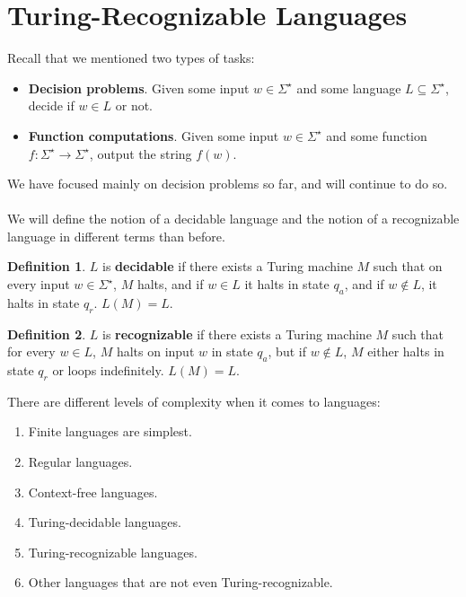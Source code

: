 \documentclass[]{article}
\theoremstyle{definition}
\newtheorem*{defn}{Definition}
\begin{document}
  \section{Turing-Recognizable Languages}
    Recall that we mentioned two types of tasks:
    \begin{itemize}
      \item \textbf{Decision problems}. Given some input $w \in \Sigma^\star$ and some language $L \subseteq \Sigma^\star$, decide if $w \in L$ or not.
      \item \textbf{Function computations}. Given some input $w \in \Sigma^\star$ and some function $f: \Sigma^\star \to \Sigma^\star$, output the string $f(w)$.
    \end{itemize}

    We have focused mainly on decision problems so far, and will continue to do so.
    \\ \\
    We will define the notion of a decidable language and the notion of a recognizable language in different terms than before.
    \begin{defn}
      $L$ is \textbf{decidable} if there exists a Turing machine $M$ such that on every input $w \in \Sigma^\star$, $M$ halts, and if $w \in L$ it halts in state $q_a$, and if $w \not \in L$, it halts in state $q_r$. $L(M) = L$.
    \end{defn}

    \begin{defn}
      $L$ is \textbf{recognizable} if there exists a Turing machine $M$ such that for every $w \in L$, $M$ halts on input $w$ in state $q_a$, but if $w \not \in L$, $M$ either halts in state $q_r$ or loops indefinitely. $L(M) = L$.
    \end{defn}

    There are different levels of complexity when it comes to languages:
    \begin{enumerate}
      \item Finite languages are simplest.
      \item Regular languages.
      \item Context-free languages.
      \item Turing-decidable languages.
      \item Turing-recognizable languages.
      \item Other languages that are not even Turing-recognizable.
    \end{enumerate}
\end{document}
